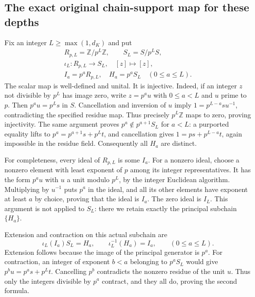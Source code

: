 \subsection{The exact original chain-support map for these depths}

Fix an integer \(L\geq\max(1,d_K)\) and put
\[
 \begin{gathered}
 R_{p,L}=\mathbb Z/p^L\mathbb Z,\qquad S_L=S/p^L S,\\
 \iota_L:R_{p,L}\longrightarrow S_L,
       \quad [z]\longmapsto[z],\\
 I_a=p^aR_{p,L},\quad H_a=p^aS_L\quad(0\leq a\leq L).
 \end{gathered}
 \tag{TCL.21}\label{CFStage:eq:tcl-chain-rings}
\]
The scalar map is well-defined and unital. It is injective.
Indeed, if an integer \(z\) not divisible by \(p^L\) has image
zero, write \(z=p^a u\) with \(0\leq a<L\) and \(u\) prime
to \(p\). Then \(p^a u=p^L s\) in \(S\). Cancellation and
inversion of \(u\) imply \(1=p^{L-a}s u^{-1}\), contradicting
the specified residue map. Thus precisely \(p^L\mathbb Z\)
maps to zero, proving injectivity. The same argument proves
\(p^a\notin p^{a+1}S_L\) for \(a<L\): a purported equality
lifts to \(p^a=p^{a+1}s+p^L t\), and cancellation gives
\(1=p s+p^{L-a}t\), again impossible in the residue field.
Consequently all \(H_a\) are distinct.

For completeness, every ideal of \(R_{p,L}\) is some \(I_a\).
For a nonzero ideal, choose a nonzero element with least exponent
of \(p\) among its integer representatives. It has the form
\(p^a u\) with \(u\) a unit modulo \(p^L\), by the integer
Euclidean algorithm. Multiplying by \(u^{-1}\) puts \(p^a\)
in the ideal, and all its other elements have exponent at least
\(a\) by choice, proving that the ideal is \(I_a\). The zero
ideal is \(I_L\). This argument is not applied to \(S_L\):
there we retain exactly the principal subchain \(\{H_a\}\).

Extension and contraction on this actual subchain are
\[
 \iota_L(I_a)S_L=H_a,\qquad \iota_L^{-1}(H_a)=I_a,
 \qquad(0\leq a\leq L).
 \tag{TCL.22}\label{CFStage:eq:tcl-extend-contract}
\]
Extension follows because the image of the principal generator is
\(p^a\). For contraction, an integer of exponent \(b<a\)
belonging to \(p^aS_L\) would give
\(p^b u=p^a s+p^L t\). Cancelling \(p^b\) contradicts the
nonzero residue of the unit \(u\). Thus only the integers divisible
by \(p^a\) contract, and they all do, proving the second formula.


